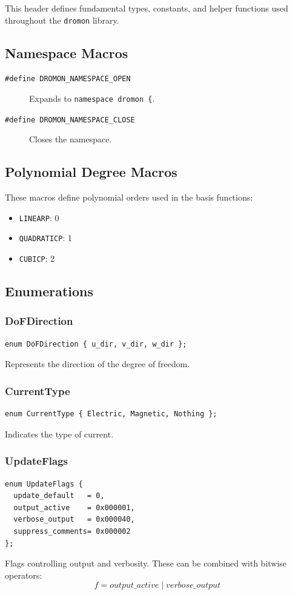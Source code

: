 \documentclass{article}
\begin{document}
This header defines fundamental types, constants, and helper functions used throughout the \texttt{dromon} library.

\subsection{Namespace Macros}

\begin{description}
  \item[\texttt{\#define DROMON\_NAMESPACE\_OPEN}] Expands to \texttt{namespace dromon \{}.
  \item[\texttt{\#define DROMON\_NAMESPACE\_CLOSE}] Closes the namespace.
\end{description}

\subsection{Polynomial Degree Macros}
These macros define polynomial orders used in the basis functions:
\begin{itemize}
  \item \texttt{LINEARP}: 0
  \item \texttt{QUADRATICP}: 1
  \item \texttt{CUBICP}: 2
\end{itemize}

\subsection{Enumerations}

\subsubsection*{DoFDirection}
\begin{verbatim}
enum DoFDirection { u_dir, v_dir, w_dir };
\end{verbatim}
Represents the direction of the degree of freedom.

\subsubsection*{CurrentType}
\begin{verbatim}
enum CurrentType { Electric, Magnetic, Nothing };
\end{verbatim}
Indicates the type of current.

\subsubsection*{UpdateFlags}
\begin{verbatim}
enum UpdateFlags {
  update_default   = 0,
  output_active    = 0x000001,
  verbose_output   = 0x000040,
  suppress_comments= 0x000002
};
\end{verbatim}
Flags controlling output and verbosity. These can be combined with bitwise operators:
\[
f = output\_active \mid verbose\_output
\]
\end{document}
